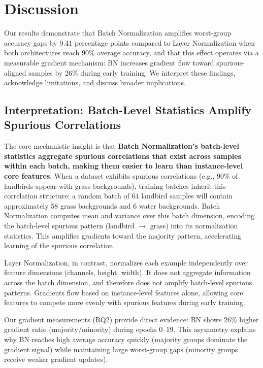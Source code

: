 \section{Discussion}

Our results demonstrate that Batch Normalization amplifies worst-group accuracy gaps by 9.41 percentage points compared to Layer Normalization when both architectures reach 90\% average accuracy, and that this effect operates via a measurable gradient mechanism: BN increases gradient flow toward spurious-aligned samples by 26\% during early training. We interpret these findings, acknowledge limitations, and discuss broader implications.

\subsection{Interpretation: Batch-Level Statistics Amplify Spurious Correlations}

The core mechanistic insight is that \textbf{Batch Normalization's batch-level statistics aggregate spurious correlations that exist across samples within each batch, making them easier to learn than instance-level core features}. When a dataset exhibits spurious correlations (e.g., 90\% of landbirds appear with grass backgrounds), training batches inherit this correlation structure: a random batch of 64 landbird samples will contain approximately 58 grass backgrounds and 6 water backgrounds. Batch Normalization computes mean and variance over this batch dimension, encoding the batch-level spurious pattern (landbird $\rightarrow$ grass) into its normalization statistics. This amplifies gradients toward the majority pattern, accelerating learning of the spurious correlation.

Layer Normalization, in contrast, normalizes each example independently over feature dimensions (channels, height, width). It does not aggregate information across the batch dimension, and therefore does not amplify batch-level spurious patterns. Gradients flow based on instance-level features alone, allowing core features to compete more evenly with spurious features during early training.

Our gradient measurements (RQ2) provide direct evidence: BN shows 26\% higher gradient ratio (majority/minority) during epochs 0--19. This asymmetry explains why BN reaches high average accuracy quickly (majority groups dominate the gradient signal) while maintaining large worst-group gaps (minority groups receive weaker gradient updates).

